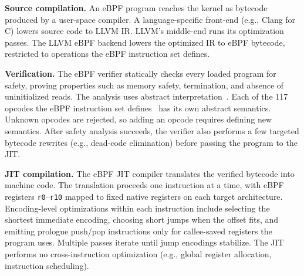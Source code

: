 \noindent\textbf{Source compilation.}
An eBPF program reaches the kernel as bytecode produced by a user-space compiler. A language-specific front-end (e.g., Clang for C) lowers source code to LLVM IR. LLVM's middle-end runs its optimization passes. The LLVM eBPF backend lowers the optimized IR to eBPF bytecode, restricted to operations the eBPF instruction set defines.

\noindent\textbf{Verification.}
The eBPF verifier statically checks every loaded program for safety, proving properties such as memory safety, termination, and absence of uninitialized reads. The analysis uses abstract interpretation~\cite{gershuni2019simple}. Each of the 117 opcodes the eBPF instruction set defines~\cite{rfc9669} has its own abstract semantics. Unknown opcodes are rejected, so adding an opcode requires defining new semantics. After safety analysis succeeds, the verifier also performs a few targeted bytecode rewrites (e.g., dead-code elimination) before passing the program to the JIT.

\noindent\textbf{JIT compilation.}
The eBPF JIT compiler translates the verified bytecode into machine code. The translation proceeds one instruction at a time, with eBPF registers \texttt{r0}--\texttt{r10} mapped to fixed native registers on each target architecture. Encoding-level optimizations within each instruction include selecting the shortest immediate encoding, choosing short jumps when the offset fits, and emitting prologue push/pop instructions only for callee-saved registers the program uses. Multiple passes iterate until jump encodings stabilize. The JIT performs no cross-instruction optimization (e.g., global register allocation, instruction scheduling).

